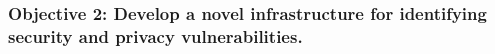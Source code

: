 \documentclass[a4paper,11pt]{article}
\newcommand{\project}[1]{\textbf{#1}\xspace}
\newcommand{\SECURITY}{\project{Elysian}}
\newcommand{\TheProject}{\SECURITY}
\begin{document}


\subsubsection*{Objective 2: Develop a novel infrastructure for identifying security and privacy vulnerabilities.}
\vspace{-6pt}
\end{document}
